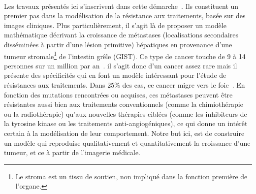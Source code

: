 \documentclass[main.tex]{subfiles}
\begin{document}
\paragraph{}
Les travaux présentés ici s'inscrivent dans cette démarche~\cite{cornelis2013vivo,jouganous2014}. Ils constituent un premier pas dans la modélisation de la résistance aux traitements, basée sur des images cliniques. 
Plus particulièrement, il s'agit là de proposer un modèle mathématique décrivant la croissance de métastases 
(localisations secondaires disséminées à partir d'une lésion primitive)
hépatiques en provenance d'une  
tumeur stromale\footnote{Le stroma est un tissu de soutien, non impliqué dans la fonction première de l'organe.} de l'intestin grêle
(GIST).
Ce type de cancer touche de 9 à 14 personnes sur un million par an~\cite{Nilsson2005}. 
il s'agit donc d'un cancer assez rare mais il présente des spécificités qui en font un modèle intéressant pour l'étude de résistances aux traitements. 
Dans 25\% des cas, ce cancer migre vers le foie~\cite{dematteo2000}. 
En fonction des mutations rencontrées ou acquises, ces métastases peuvent être résistantes aussi bien aux traitements conventionnels (comme la chimiothérapie ou la radiothérapie) qu'aux nouvelles thérapies ciblées (comme les inhibiteurs de la tyrosine kinase ou les traitements anti-angiogéniques), ce qui donne un intérêt certain à la modélisation de leur comportement. 
Notre but ici, est de construire un modèle qui reproduise qualitativement et quantitativement la croissance d'une tumeur, et ce à partir de l'imagerie médicale.
\end{document}
